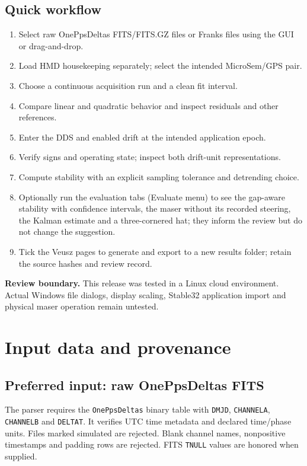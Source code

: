 \documentclass[11pt,a4paper]{article}
\renewcommand{\_}{\usscore\allowbreak}
\newcommand{\warning}[1]{\par\noindent\colorbox{light}{\parbox{\dimexpr\linewidth-2\fboxsep}{\textbf{Review boundary.} #1}}\par}
\begin{document}
\subsection{Quick workflow}
\begin{enumerate}[leftmargin=6mm,itemsep=4pt]
\item Select raw OnePpsDeltas FITS/FITS.GZ files or Franks files using the GUI or drag-and-drop.
\item Load HMD housekeeping separately; select the intended MicroSem/GPS pair.
\item Choose a continuous acquisition run and a clean fit interval.
\item Compare linear and quadratic behavior and inspect residuals and other references.
\item Enter the DDS and enabled drift at the intended application epoch.
\item Verify signs and operating state; inspect both drift-unit representations.
\item Compute stability with an explicit sampling tolerance and detrending choice.
\item Optionally run the evaluation tabs (Evaluate menu) to see the gap-aware stability with
confidence intervals, the maser without its recorded steering, the Kalman estimate and a
three-cornered hat; they inform the review but do not change the suggestion.
\item Tick the Veusz pages to generate and export to a new results folder; retain the source
hashes and review record.
\end{enumerate}

\warning{This release was tested in a Linux cloud environment. Actual Windows
file dialogs, display scaling, Stable32 application import and physical
maser operation remain untested.}
\clearpage

\section{Input data and provenance}
\subsection{Preferred input: raw OnePpsDeltas FITS}
The parser requires the \texttt{OnePpsDeltas} binary table with \texttt{DMJD},
\texttt{CHANNELA}, \texttt{CHANNELB} and \texttt{DELTAT}. It verifies UTC time
metadata and declared time/phase units. Files marked simulated are rejected.
Blank channel names, nonpositive timestamps and padding rows are rejected.
FITS \texttt{TNULL} values are honored when supplied.
\end{document}
